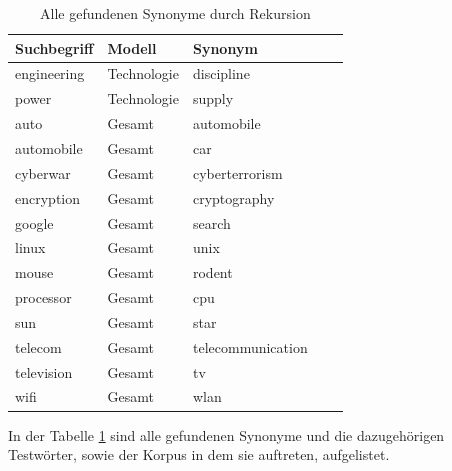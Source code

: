 \documentclass[12pt,a4paper]{report}
\begin{document}
\begin{table}[H]
\caption{Alle gefundenen Synonyme durch Rekursion}
\label{tab:bspsynoyme}
\begin{center}
\begin{tabular}{|l||l|l|l|l|}
\hline
\textbf{Suchbegriff} & \textbf{Modell} & \textbf{Synonym}   \\

\hline
 engineering & Technologie & discipline \\
 \hline	
 power	& Technologie	& supply	\\
 \hline
 \hline
auto & Gesamt & automobile\\
\hline
automobile & Gesamt & car\\
\hline
cyberwar & Gesamt & cyberterrorism\\
\hline
encryption & Gesamt & cryptography\\
\hline
google & Gesamt & search\\
\hline
linux & Gesamt & unix\\
\hline
mouse & Gesamt & rodent\\
\hline
processor & Gesamt & cpu\\
\hline
sun & Gesamt & star\\
\hline
telecom & Gesamt & telecommunication\\
\hline
television & Gesamt & tv\\
\hline
wifi & Gesamt & wlan\\
 	\hline
 
\end{tabular}
\end{center}
\end{table}
		
 In der Tabelle \ref{tab:bspsynoyme} sind alle gefundenen Synonyme und die dazugehörigen Testwörter, sowie der Korpus in dem sie auftreten, aufgelistet.
		
\end{document}
